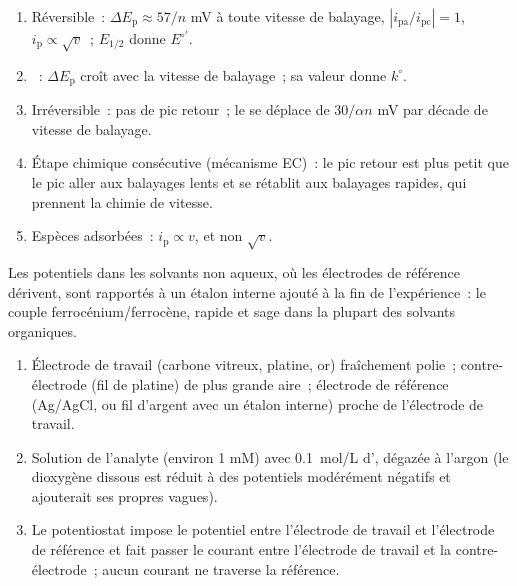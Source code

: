 \begin{method}\label{met:b3:electrode-kinetics:cv-diagnosis}
\begin{enumerate}
  \item Réversible~: $\Delta E_{\mathrm p} \approx 57/n$ mV à toute vitesse de balayage, $|i_{\mathrm{pa}}/i_{\mathrm{pc}}| = 1$, $i_{\mathrm p} \propto \sqrt v$~;
        $E_{1/2}$ donne $E^{\circ\prime}$.
  \item {}~: $\Delta E_{\mathrm p}$ croît avec la vitesse
        de balayage~; sa valeur donne $k^\circ$.
  \item Irréversible~: pas de pic retour~; le  se déplace
        de $30/\alpha n$ mV par
        décade de vitesse de balayage.
  \item Étape chimique consécutive (mécanisme EC)~: le pic retour est plus
        petit que le pic aller aux balayages lents et se rétablit aux
        balayages rapides, qui prennent la chimie de vitesse.
  \item Espèces adsorbées~: $i_{\mathrm p} \propto v$, et non $\sqrt v$.
\end{enumerate}
\end{method}

Les potentiels dans les solvants non aqueux, où les électrodes de
référence dérivent, sont rapportés à un étalon interne ajouté à la fin
de l'expérience~: le couple ferrocénium/ferrocène, rapide et sage dans la
plupart des solvants organiques.

\begin{method}\label{met:b3:electrode-kinetics:three-electrode}
\begin{enumerate}
  \item Électrode de travail (carbone vitreux, platine, or) fraîchement
        polie~; contre-électrode (fil de platine) de plus grande aire~;
        électrode de référence (Ag/AgCl, ou fil d'argent avec un étalon
        interne) proche de l'électrode de travail.
  \item Solution de l'analyte (environ 1 mM) avec \qty{0.1}{mol/L}
        d', dégazée à l'argon (le dioxygène dissous est
        réduit à des potentiels modérément négatifs et ajouterait ses
        propres vagues).
  \item Le potentiostat impose le potentiel entre l'électrode de travail
        et l'électrode de référence et fait passer le courant entre
        l'électrode de travail et la contre-électrode~; aucun courant ne
        traverse la référence.
\end{enumerate}
\end{method}

